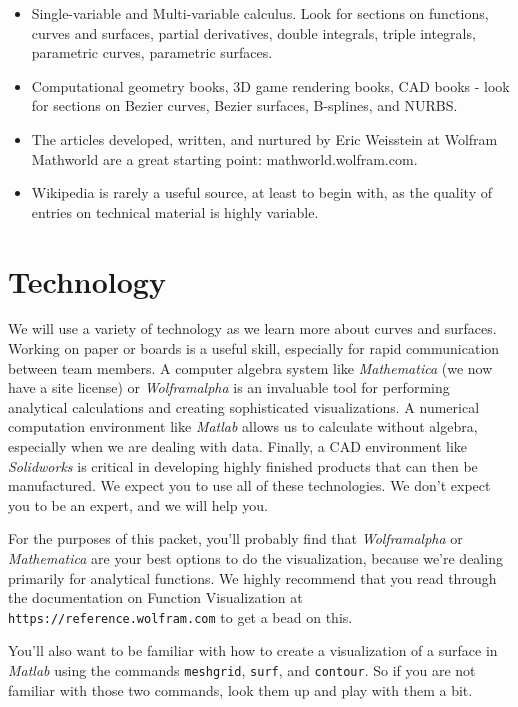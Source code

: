 \documentclass{tufte-handout}
\begin{document}
\begin{itemize}
\item Single-variable and Multi-variable calculus. Look for sections on functions, curves and surfaces, partial derivatives, double integrals, triple integrals, parametric curves, parametric surfaces.
\item Computational geometry books, 3D game rendering books, CAD books - look for sections on Bezier curves, Bezier surfaces, B-splines, and NURBS.
\item The articles developed, written, and nurtured by Eric Weisstein at Wolfram Mathworld are a great starting point: mathworld.wolfram.com.
\item Wikipedia is rarely a useful source, at least to begin with, as the quality of entries on technical material is highly variable.
\end{itemize}

\section{Technology}

We will use a variety of technology as we learn more about curves and surfaces. Working on paper or boards is a useful skill, especially for rapid communication between team members. A computer algebra system like {\it Mathematica} (we now have a site license) or {\it Wolframalpha} is an invaluable tool for performing analytical calculations and creating sophisticated visualizations. A numerical computation environment like {\it Matlab} allows us to calculate without algebra, especially when we are dealing with data. Finally, a CAD environment like {\it Solidworks} is critical in developing highly finished products that can then be manufactured. We expect you to use all of these technologies. We don't expect you to be an expert, and we will help you.

For the purposes of this packet, you'll probably find that {\it Wolframalpha} or {\it Mathematica} are your best options to do the visualization, because we're dealing primarily for analytical functions.  We highly recommend that you read through the documentation on Function Visualization at  {\tt https://reference.wolfram.com} to get a bead on this.

You'll also want to be familiar with how to create a visualization of a surface in {\it Matlab}  using the commands {\tt meshgrid}, {\tt surf}, and {\tt contour}.  So if you are not familiar with those two commands, look them up and play with them a bit.
\end{document}
